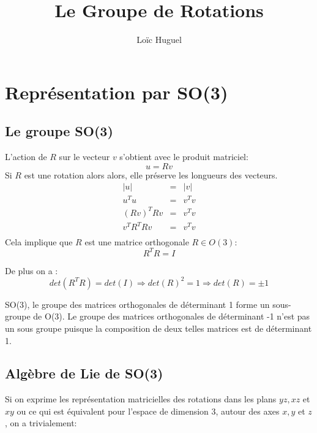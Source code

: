 \documentclass[12pt,a4paper]{article}
\title{Le Groupe de Rotations}
\author{Loïc Huguel}
\begin{document}
	\maketitle
	
	\tableofcontents
	
	\newpage
	\section{Représentation par SO(3)}
	
	\subsection{Le groupe SO(3)}
	
	L'action de $R$ sur le vecteur $v$ s'obtient avec le produit matriciel:
	\[
		u=Rv
	\]
	Si $R$ est une rotation alors alors, elle préserve les longueurs des vecteurs.	
	\begin{eqnarray*}
		 |u|&=&|v|\\
		u^Tu&=&v^Tv\\
		(Rv)^TRv&=&v^Tv\\
		v^TR^TRv&=&v^Tv\\
	\end{eqnarray*}
	Cela implique que $R$ est une matrice orthogonale $R\in O(3)$:
	\[
		\boxed{R^TR=I}
	\]

	De plus on a :
	\[
	det(R^TR)=det(I) \Rightarrow det(R)^2= 1 \Rightarrow \boxed{det(R)=\pm 1}
	\]
	
	SO(3), le groupe des matrices orthogonales de déterminant 1 forme un sous-groupe de O(3). Le groupe des matrices orthogonales de déterminant -1 n'est pas un sous groupe puisque la composition de deux telles matrices est de déterminant 1.
	
	
	\newpage
	\subsection{Algèbre de Lie de SO(3)}
	
	Si on exprime les représentation matricielles des rotations dans les plans $yz,xz$ et $xy$ ou ce qui est équivalent pour l'espace de dimension 3, autour des axes $x,y$ et $z$, on a trivialement:
	
\end{document}
